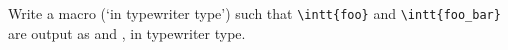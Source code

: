 Write a macro  (`in typewriter type')
such that \verb+\intt{foo}+ and
\verb+\intt{foo_bar}+ are output as  and ,
 in typewriter type.
